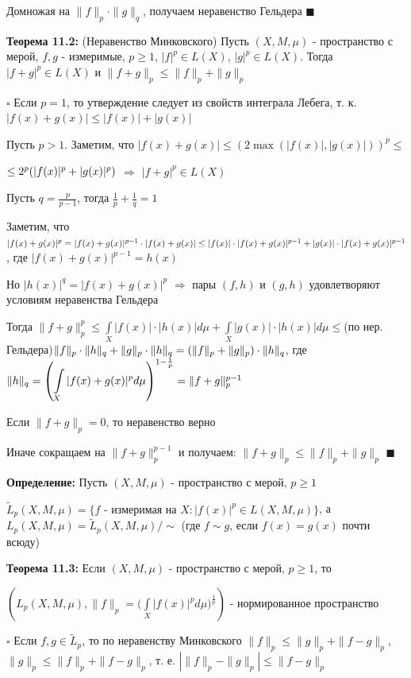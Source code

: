 \documentclass[a4paper]{report}
\newcommand*{\hm}[1]{#1\nobreak\discretionary{}%
            {\hbox{$\mathsurround=0pt #1$}}{}}
\begin{document}
Домножая на $\|f\|_p\cdot\|g\|_q$, получаем неравенство Гельдера $\blacksquare$
\bigskip

\noindent\textbf{Теорема 11.2:} (Неравенство Минковского) Пусть $(X,M,\mu)$ - пространство с мерой, $f,g$ - измеримые, $p\ge1$, $|f|^p\in L(X)$, $|g|^p\in L(X)$.
Тогда $|f+g|^p\in L(X)$ и $\|f+g\|_p\le\|f\|_p+\|g\|_p$

\noindent $\square$ Если $p=1$, то утверждение следует из свойств интеграла Лебега, т. к. $|f(x)+g(x)|\le|f(x)|+|g(x)|$

Пусть $p>1$. Заметим, что $|f(x)+g(x)|\le\left(2\max(|f(x)|,|g(x)|)\right)^p\le$

$\noindent\le2^p(|f(x)|^p+|g(x)|^p)$ $\Rightarrow$ $|f+g|^p\in L(X)$

Пусть $q=\frac{p}{p-1}$, тогда $\frac1p+\frac1q=1$

Заметим, что $|f(x)+g(x)|^p=|f(x)+g(x)|^{p-1}\cdot|f(x)+g(x)|\le|f(x)|\hm\cdot|f(x)+g(x)|^{p-1}+|g(x)|\cdot|f(x)+g(x)|^{p-1}$, где $|f(x)+g(x)|^{p-1}=h(x)$

Но $|h(x)|^q=|f(x)+g(x)|^p$ $\Rightarrow$ пары $(f,h)$ и $(g,h)$ удовлетворяют условиям неравенства Гельдера

Тогда $\|f+g\|_p^p\le\displaystyle\int\limits_X|f(x)|\cdot|h(x)|d\mu+\displaystyle\int\limits_X|g(x)|\cdot|h(x)|d\mu\le$(по нер. Гельдера)$\|f\|_p\hm\cdot\|h\|_q+\|g\|_p\cdot\|h\|_q=\left(\|f\|_p+\|g\|_p\right)\cdot\|h\|_q$, где $\|h\|_q=\left(\displaystyle\int\limits_X|f(x)+g(x)|^pd\mu\right)^{1-\frac1p}\hm=\|f+g\|_p^{p-1}$

Если $\|f+g\|_p=0$, то неравенство верно

Иначе сокращаем на $\|f+g\|_p^{p-1}$ и получаем: $\|f+g\|_p\le\|f\|_p+\|g\|_p$ $\blacksquare$
\bigskip

\noindent\textbf{Определение:} Пусть $(X,M,\mu)$ - пространство с мерой, $p\ge1$

$\tilde L_p(X,M,\mu)=\{f\text{ - измеримая на }X\colon|f(x)|^p\in L(X,M,\mu)\}$, а $L_p(X,M,\mu)=\tilde L_p(X,M,\mu)/\sim$ (где $f\sim g$, если $f(x)=g(x)$ почти всюду)
\bigskip

\noindent\textbf{Теорема 11.3:} Если $(X,M,\mu)$ - пространство с мерой, $p\ge1$, то

$\left(L_p(X,M,\mu),\|f\|_p=\biggl(\displaystyle\int\limits_X|f(x)|^pd\mu\biggr)^\frac1p\right)$ - нормированное пространство

\noindent $\square$ Если $f,g\in\tilde L_p$, то по неравенству Минковского $\|f\|_p\le\|g\|_p+\|f-g\|_p$, $\|g\|_p\le\|f\|_p+\|f-g\|_p$, т. е. $\left|\|f\|_p-\|g\|_p
\right|\le\|f-g\|_p$
\end{document}
